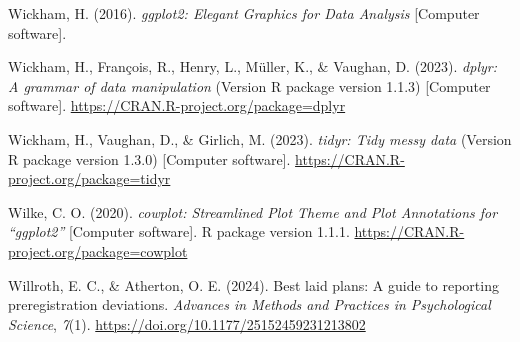 \documentclass[authordate, meta]{jote-new-article}
\begin{document}
	Wickham, H. (2016). \emph{ggplot2: Elegant Graphics for Data Analysis} [Computer software].



	Wickham, H., François, R., Henry, L., Müller, K., \& Vaughan, D. (2023). \emph{dplyr: A grammar of data manipulation} (Version R package version 1.1.3) [Computer software]. \url{https://CRAN.R-project.org/package=dplyr}



	Wickham, H., Vaughan, D., \& Girlich, M. (2023). \emph{tidyr: Tidy messy data} (Version R package version 1.3.0) [Computer software]. \url{https://CRAN.R-project.org/package=tidyr}



	Wilke, C. O. (2020). \emph{cowplot: Streamlined Plot Theme and Plot Annotations for “ggplot2”} [Computer software]. R package version 1.1.1. \url{https://CRAN.R-project.org/package=cowplot}



	Willroth, E. C., \& Atherton, O. E. (2024). Best laid plans: A guide to reporting preregistration deviations. \emph{Advances in Methods and Practices in Psychological Science}, \emph{7}(1). \url{https://doi.org/10.1177/25152459231213802}
\end{document}
